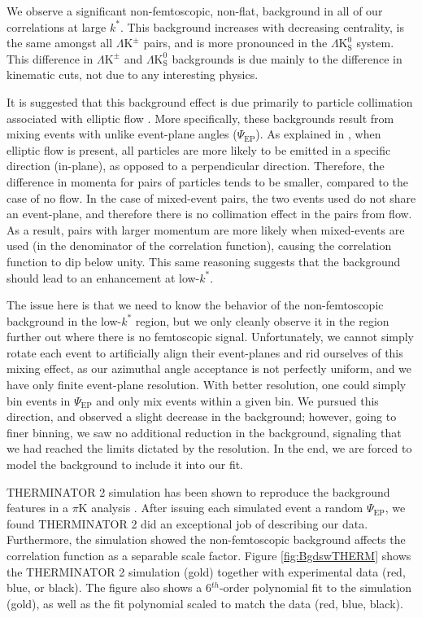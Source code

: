 \documentclass[ALICE,manyauthors]{cernphprep}
\newcommand{\kstar}{$k^{*}$\xspace}
\newcommand{\LamKpm}{$\Lambda\mathrm{K^{\pm}}$\xspace}
\newcommand{\LamKs}{$\Lambda\mathrm{K^{0}_{S}}$\xspace}
\begin{document}
We observe a significant non-femtoscopic, non-flat, background in all of our correlations at large \kstar.  
This background increases with decreasing centrality, is the same amongst all \LamKpm pairs, and is more pronounced in the \LamKs system.
This difference in \LamKpm and \LamKs backgrounds is due mainly to the difference in kinematic cuts, not due to any interesting physics.  

It is suggested that this background effect is due primarily to particle collimation associated with elliptic flow \cite{Kisiel:2017}.  
More specifically, these backgrounds result from mixing events with unlike event-plane angles ($\Psi_{\textrm{EP}}$).  
As explained in \cite{Kisiel:2017}, when elliptic flow is present, all particles are more likely to be emitted in a specific direction (in-plane), as opposed to a perpendicular direction.  
Therefore, the difference in momenta for pairs of particles tends to be smaller, compared to the case of no flow.  
In the case of mixed-event pairs, the two events used do not share an event-plane, and therefore there is no collimation effect in the pairs from flow.  
As a result, pairs with larger momentum are more likely when mixed-events are used (in the denominator of the correlation function), causing the correlation function to dip below unity.  
This same reasoning suggests that the background should lead to an enhancement at low-$k^{*}$. 

The issue here is that we need to know the behavior of the non-femtoscopic background in the low-\kstar region, but we only cleanly observe it in the region further out where there is no femtoscopic signal.
Unfortunately, we cannot simply rotate each event to artificially align their event-planes and rid ourselves of this mixing effect, as our azimuthal angle acceptance is not perfectly uniform, and we have only finite event-plane resolution.
With better resolution, one could simply bin events in $\Psi_{\mathrm{EP}}$ and only mix events within a given bin.
We pursued this direction, and observed a slight decrease in the background; however, going to finer binning, we saw no additional reduction in the background, signaling that we had reached the limits dictated by the resolution.
In the end, we are forced to model the background to include it into our fit.

THERMINATOR 2 simulation has been shown to reproduce the background features in a $\pi$K analysis \cite{Kisiel:2017}.  
After issuing each simulated event a random $\Psi_{\mathrm{EP}}$, we found THERMINATOR 2 did an exceptional job of describing our data.  
Furthermore, the simulation showed the non-femtoscopic background affects the correlation function as a separable scale factor.
Figure \ref{fig:BgdswTHERM} shows the THERMINATOR 2 simulation (gold) together with experimental data (red, blue, or black).  
The figure also shows a 6$^{th}$-order polynomial fit to the simulation (gold), as well as the fit polynomial scaled to match the data (red, blue, black).
\end{document}
